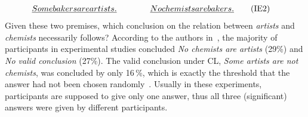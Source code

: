 \documentclass[12pt]{article}
\begin{document}
\begin{align}
 \emph{Some bakers are artists. }\quad\quad  \quad\quad & \emph{No chemists are bakers.} \tag{IE2} 
\end{align}
Given these
two premises, which conclusion on the relation between \emph{artists} and \emph{chemists} necessarily follows?
According to the authors in~\cite{khemlani:2012}, the majority of participants in experimental studies
concluded \emph{No chemists are artists} (29\;\%) and \emph{No valid conclusion} (27\;\%).
The valid conclusion under CL, \emph{Some artists are not chemists},
was concluded by only 16\,\%, which is exactly the threshold that the answer had not been chosen randomly~\cite{khemlani:2012}.
Usually in these experiments, participants are supposed to give only one answer, thus all three (significant) answers
were given by different participants. 
\end{document}
